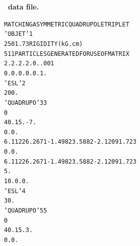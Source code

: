 \begin{center}
\noindent \textbf{ \zgoubi\ data file.}
\begin{scriptsize}
\begin{alltt}
MATCHING A SYMMETRIC QUADRUPOLE TRIPLET                            
 'OBJET'                                                                                                      1
2501.73            RIGIDITY (kG.cm)
5                  11 PARTICLES GENERATED FOR USE OF MATRIX                                                      
2.  2.  2.   2.  0. .001                                                                                      
0.  0.  0.   0.  0.  1.                                                                                       
 'ESL   '                                                                                                     2
200.                                                                                                          
 'QUADRUPO'    3                                                                                              3
0                                                                                                             
40.  15.  -7.                                                                                                 
0.  0.                                                                                                        
6  .1122 6.2671 -1.4982 3.5882 -2.1209 1.723                                                                  
0.   0.                                                                                                       
6  .1122 6.2671 -1.4982 3.5882 -2.1209 1.723                                                                  
5.                                                                                                            
1 0. 0. 0.                                                                                                    
 'ESL'                                                                                                        4
30.                                                                                                           
 'QUADRUPO'     5                                                                                             5
0                                                                                                             
40.  15.  3.                                                                                                  
0.  0.                                                                                                        

\end{alltt}
\end{scriptsize}
\end{center}

